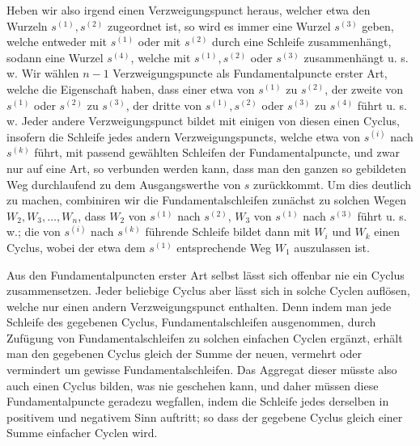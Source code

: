 \documentclass[10pt]{article}
\begin{document}
Heben wir also irgend einen Verzweigungspunct heraus, welcher etwa den Wurzeln \(s^{(1)},s^{(2)}\) zugeordnet ist, so wird es immer eine Wurzel \(s^{(3)}\) geben, welche entweder mit \(s^{(1)}\) oder mit \(s^{(2)}\) durch eine Schleife zusammenhängt, sodann eine Wurzel \(s^{(4)}\), welche mit \(s^{(1)},s^{(2)}\) oder \(s^{(3)}\) zusammenhängt u. s. w. Wir wählen \(n-1\) Verzweigungspuncte als Fundamentalpuncte erster Art, welche die Eigenschaft haben, dass einer etwa von \(s^{(1)}\) zu \(s^{(2)}\), der zweite von \(s^{(1)}\) oder \(s^{(2)}\) zu \(s^{(3)}\), der dritte von \(s^{(1)},s^{(2)}\) oder \(s^{(3)}\) zu \(s^{(4)}\) führt u. s. w. Jeder andere Verzweigungspunct bildet mit einigen von diesen einen Cyclus, insofern die Schleife jedes andern Verzweigungspuncts, welche etwa von \(s^{(i)}\) nach \(s^{(k)}\) führt, mit passend gewählten Schleifen der Fundamentalpuncte, und zwar nur auf eine Art, so verbunden werden kann, dass man den ganzen so gebildeten Weg durchlaufend zu dem Ausgangswerthe von \(s\) zurückkommt. Um dies deutlich zu machen, combiniren wir die Fundamentalschleifen zunächst zu solchen Wegen \(W_2,W_3,\ldots,W_n\), dass \(W_2\) von \(s^{(1)}\) nach \(s^{(2)}\), \(W_3\) von \(s^{(1)}\) nach \(s^{(3)}\) führt u. s. w.; die von \(s^{(i)}\) nach \(s^{(k)}\) führende Schleife bildet dann mit \(W_i\) und \(W_k\) einen Cyclus, wobei der etwa dem \(s^{(1)}\) entsprechende Weg \(W_1\) auszulassen ist.

Aus den Fundamentalpuncten erster Art selbst lässt sich offenbar nie ein Cyclus zusammensetzen. Jeder beliebige Cyclus aber lässt sich in solche Cyclen auflösen, welche nur einen andern Verzweigungspunct enthalten. Denn indem man jede Schleife des gegebenen Cyclus, Fundamentalschleifen ausgenommen, durch Zufügung von Fundamentalschleifen zu solchen einfachen Cyclen ergänzt, erhält man den gegebenen Cyclus gleich der Summe der neuen, vermehrt oder vermindert um gewisse Fundamentalschleifen. Das Aggregat dieser müsste also auch einen Cyclus bilden, was nie geschehen kann, und daher müssen diese Fundamentalpuncte geradezu wegfallen, indem die Schleife jedes derselben in positivem und negativem Sinn auftritt; so dass der gegebene Cyclus gleich einer Summe einfacher Cyclen wird.
\end{document}
